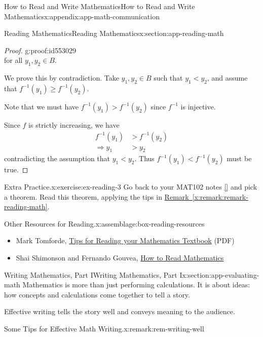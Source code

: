 \documentclass[oneside,10pt,]{book}
\newcommand{\xreffont}{\relax}
\numberwithin{equation}{section}
\newcommand{\lt}{<}
\newcommand{\gt}{>}
\newcommand{\amp}{&}
\begin{document}
\begin{appendixptx}{How to Read and Write Mathematics}{}{How to Read and Write Mathematics}{}{}{x:appendix:app-math-communication}
\begin{sectionptx}{Reading Mathematics}{}{Reading Mathematics}{}{}{x:section:app-reading-math}
\begin{proof}{}{g:proof:id553029}
\begin{equation*}
\end{equation*}
for all \(y_1,y_2 \in B\).%
\par
We prove this by contradiction. Take \(y_1,y_2 \in B\) such that \(y_1 \lt y_2\), and assume that \(f^{-1}(y_1) \geq f^{-1}(y_2)\).%
\par
Note that we must have \(f^{-1}(y_1) > f^{-1}(y_2)\) since \(f^{-1}\) is injective.%
\par
Since \(f\) is strictly increasing, we have%
\begin{align*}
f^{-1}(y_1) \amp \gt f^{-1}(y_2) \\
\Rightarrow y_1 \amp \gt y_2
\end{align*}
contradicting the assumption that \(y_1 \lt y_2\). Thus \(f^{-1}(y_1) \lt f^{-1}(y_2)\) must be true.%
\end{proof}
\begin{inlineexercise}{Extra Practice.}{x:exercise:ex-reading-3}%
Go back to your MAT102 notes \hyperlink{x:biblio:bib-fuchs-102}{[{\xreffont 3}]} and pick a theorem. Read this theorem, applying the tips in \hyperref[x:remark:remark-reading-math]{Remark~{\xreffont\ref{x:remark:remark-reading-math}}}.%
\end{inlineexercise}%
\begin{assemblage}{Other Resources for Reading.}{x:assemblage:box-reading-resources}%
%
\begin{itemize}[label=\textbullet]
\item{}Mark Tomforde, \href{https://marktomforde.com/academic/mathmajors/images/MathReadingTips.pdf}{Tips for Reading your Mathematics Textbook} (PDF)%
\item{}Shai Shimonson and Fernando Gouvea, \href{https://web.stonehill.edu/compsci/History_Math/math-read.htm}{How to Read Mathematics}%
\end{itemize}
%
\end{assemblage}
\end{sectionptx}
%
%
\typeout{************************************************}
\typeout{************************************************}
%
\begin{sectionptx}{Writing Mathematics, Part I}{}{Writing Mathematics, Part I}{}{}{x:section:app-evaluating-math}
Mathematics is more than just performing calculations. It is about ideas: how concepts and calculations come together to tell a story.%
\par
Effective writing tells the story well and conveys meaning to the audience.%
\begin{remark}{Some Tips for Effective Math Writing.}{x:remark:rem-writing-well}%

\end{remark}
\end{sectionptx}
\end{appendixptx}
\end{document}
